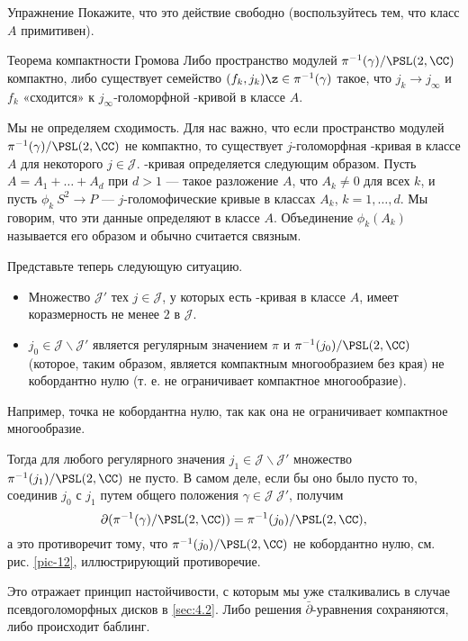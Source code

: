 \begin{ex*}{Упражнение}
Покажите, что это действие свободно (воспользуйтесь тем, что класс $A$ примитивен).
\end{ex*}

\begin{thm*}{Теорема компактности Громова}
Либо пространство модулей $\pi^{-1} (\gamma)/\PSL(2, \CC)$ компактно, либо существует семейство $(f_k, j_k) \z\in \pi^{-1} (\gamma)$ такое, что $j_k \to j_\infty$ и $f_k$ «сходится» к $j_\infty$-голоморфной -кривой в классе $A$.
\end{thm*}

Мы не определяем сходимость.
Для нас важно, что если пространство модулей $\pi^{-1} (\gamma)/\PSL(2, \CC)$ не компактно, то существует $j$-голоморфная -кривая в классе $A$ для некоторого $j \in \mathcal{J}$.
-кривая определяется следующим образом.
Пусть $A = A_1 +\dots+ A_d$ при $d > 1$ --- такое разложение $A$, что $A_k \ne 0$ для всех $k$, и пусть $\phi_k \: S^2 \to P$ --- $j$-голомофические кривые в классах $A_k$, $k = 1,\dots,d$.
Мы говорим, что эти данные определяют  в классе $A$.
Объединение $\phi_k (A_k)$ называется его образом и обычно считается связным.

Представьте теперь следующую ситуацию.
\begin{itemize}

\item Множество $\mathcal{J}'$ тех $j \in \mathcal{J}$, у которых есть -кривая в классе $A$, имеет коразмерность не менее $2$ в $\mathcal{J}$.

\item $j_0 \in \mathcal{J}\backslash \mathcal{J}'$ является регулярным значением $\pi$ и $\pi^{-1} (j_0)/\PSL(2, \CC)$ (которое, таким образом, является компактным многообразием без края) не кобордантно нулю (т. е. не ограничивает компактное многообразие).
 
\end{itemize}

Например, точка не кобордантна нулю, так как она не ограничивает компактное многообразие.

Тогда для любого регулярного значения $j_1 \in \mathcal{J} \backslash \mathcal{J}'$ множество $\pi^{-1} (j_1)/\PSL(2, \CC)$ не пусто.
В самом деле, если бы оно было пусто то, соединив $j_0$ с $j_1$ путем общего положения $\gamma \in \mathcal{J} \ \mathcal{J}'$, получим
\[\partial(\pi^{-1}(\gamma)/\PSL(2,\CC))
=
\pi^{-1}(j_0)/\PSL(2,\CC),
\]
а это противоречит тому, что $\pi^{-1} (j_0)/\PSL(2, \CC)$ не кобордантно нулю, см. рис. \ref{pic-12}, иллюстрирующий противоречие.

Это отражает принцип настойчивости, с которым мы уже сталкивались в случае псевдоголоморфных дисков в \ref{sec:4.2}.
Либо решения $\bar\partial$-уравнения сохраняются, либо происходит баблинг.

